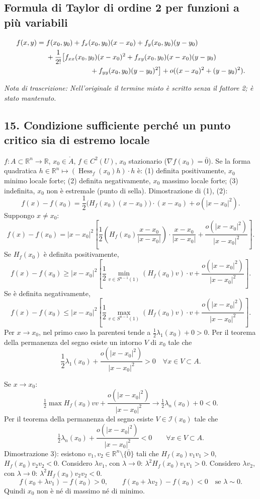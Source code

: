 \documentclass[11pt,a4paper]{article}
\newcommand{\R}{\mathbb R}\newcommand{\N}{\mathbb N}\newcommand{\pagina}[1]{\clearpage}
\newcommand{\nota}[1]{\par\textit{Nota di trascrizione: #1}\par}
\begin{document}
\subsection*{Formula di Taylor di ordine 2 per funzioni a più variabili}
\begin{align*}
f(x,y)={}&f(x_0,y_0)+f_x(x_0,y_0)(x-x_0)+f_y(x_0,y_0)(y-y_0)\\
&+\frac1{2!}\bigl[f_{xx}(x_0,y_0)(x-x_0)^2+f_{xy}(x_0,y_0)(x-x_0)(y-y_0)\\
&\hspace{22mm}+f_{yy}(x_0,y_0)(y-y_0)^2\bigr]+o((x-x_0)^2+(y-y_0)^2).
\end{align*}
\nota{Nell'originale il termine misto è scritto senza il fattore 2; è stato mantenuto.}
\pagina{33}
\subsection*{15. Condizione sufficiente perché un punto critico sia di estremo locale}
$f:A\subset\R^n\to\R$, $x_0\in\mathring A$, $f\in C^2(U)$, $x_0$ stazionario ($\nabla f(x_0)=\bar0$). Se la forma quadratica $h\in\R^n\mapsto(\operatorname{Hess}_f(x_0)h)\cdot h$ è: (1) definita positivamente, $x_0$ minimo locale forte; (2) definita negativamente, $x_0$ massimo locale forte; (3) indefinita, $x_0$ non è estremale (punto di sella).
Dimostrazione di (1), (2):
\[f(x)-f(x_0)=\frac12\bigl(H_f(x_0)(x-x_0)\bigr)\cdot(x-x_0)+o(|x-x_0|^2).\]
Suppongo $x\ne x_0$:
\[f(x)-f(x_0)=|x-x_0|^2\left[\frac12\left(H_f(x_0)\frac{x-x_0}{|x-x_0|}\right)\cdot\frac{x-x_0}{|x-x_0|}+\frac{o(|x-x_0|^2)}{|x-x_0|^2}\right].\]
Se $H_f(x_0)$ è definita positivamente,
\[f(x)-f(x_0)\ge|x-x_0|^2\left[\frac12\min_{v\in S^{n-1}(1)}(H_f(x_0)v)\cdot v+\frac{o(|x-x_0|^2)}{|x-x_0|^2}\right].\]
Se è definita negativamente,
\[f(x)-f(x_0)\le|x-x_0|^2\left[\frac12\max_{v\in S^{n-1}(1)}(H_f(x_0)v)\cdot v+\frac{o(|x-x_0|^2)}{|x-x_0|^2}\right].\]
Per $x\to x_0$, nel primo caso la parentesi tende a $\frac12\lambda_1(x_0)+0>0$. Per il teorema della permanenza del segno esiste un intorno $V$ di $x_0$ tale che
\[\frac12\lambda_1(x_0)+\frac{o(|x-x_0|^2)}{|x-x_0|^2}>0\quad\forall x\in V\subset A.\]

\pagina{34}
Se $x\to x_0$:
\[\tfrac12\max H_f(x_0)vv+\frac{o(|x-x_0|^2)}{|x-x_0|^2}\longrightarrow\tfrac12\lambda_n(x_0)+0<0.\]
Per il teorema della permanenza del segno esiste $V\in\mathcal I(x_0)$ tale che
\[\tfrac12\lambda_n(x_0)+\frac{o(|x-x_0|^2)}{|x-x_0|^2}<0\qquad\forall x\in V\subset A.\]
Dimostrazione 3): esistono $v_1,v_2\in\R^n\setminus\{\bar0\}$ tali che $H_f(x_0)v_1v_1>0$, $H_f(x_0)v_2v_2<0$. Considero $\lambda v_1$, con $\lambda\to0$: $\lambda^2H_f(x_0)v_1v_1>0$. Considero $\lambda v_2$, con $\lambda\to0$: $\lambda^2H_f(x_0)v_2v_2<0$.
\[f(x_0+\lambda v_1)-f(x_0)>0,\qquad f(x_0+\lambda v_2)-f(x_0)<0\quad\text{se }\lambda\sim0.\]
Quindi $x_0$ non è né di massimo né di minimo.
\end{document}
